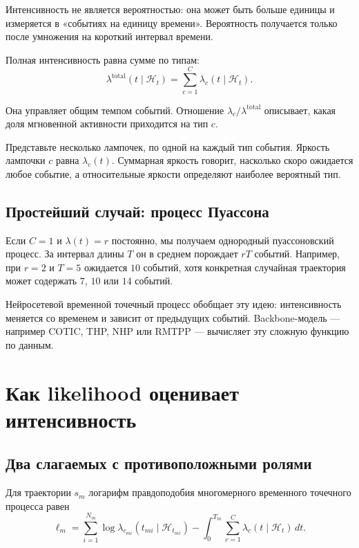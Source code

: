 \documentclass[12pt,a4paper]{article}
\newcommand{\History}{\mathcal{H}}
\newenvironment{intuitionbox}{\par\medskip\noindent{\color{blue}\bfseries Интуиция. }\ignorespaces}{\par\medskip}
\begin{document}
Интенсивность не является вероятностью: она может быть больше единицы и измеряется в «событиях на единицу времени». Вероятность получается только после умножения на короткий интервал времени.

Полная интенсивность равна сумме по типам:
\begin{equation}
\lambda^{\mathrm{total}}(t\mid\History_t)=\sum_{c=1}^{C}\lambda_c(t\mid\History_t).
\end{equation}

Она управляет общим темпом событий. Отношение \(\lambda_c/\lambda^{\mathrm{total}}\) описывает, какая доля мгновенной активности приходится на тип \(c\).

\begin{intuitionbox}
Представьте несколько лампочек, по одной на каждый тип события. Яркость лампочки \(c\) равна \(\lambda_c(t)\). Суммарная яркость говорит, насколько скоро ожидается любое событие, а относительные яркости определяют наиболее вероятный тип.
\end{intuitionbox}

\subsection{Простейший случай: процесс Пуассона}

Если \(C=1\) и \(\lambda(t)=r\) постоянно, мы получаем однородный пуассоновский процесс. За интервал длины \(T\) он в среднем порождает \(rT\) событий. Например, при \(r=2\) и \(T=5\) ожидается \(10\) событий, хотя конкретная случайная траектория может содержать \(7\), \(10\) или \(14\) событий.

Нейросетевой временной точечный процесс обобщает эту идею: интенсивность меняется со временем и зависит от предыдущих событий. Backbone-модель --- например COTIC, THP, NHP или RMTPP --- вычисляет эту сложную функцию по данным.

\section{Как likelihood оценивает интенсивность}

\subsection{Два слагаемых с противоположными ролями}

Для траектории \(s_m\) логарифм правдоподобия многомерного временного точечного процесса равен
\begin{equation}
\ell_m=\sum_{i=1}^{N_m}\log \lambda_{c_{mi}}(t_{mi}\mid\History_{t_{mi}})-\int_0^{T_m}\sum_{c=1}^{C}\lambda_c(t\mid\History_t)\,dt.
\label{eq:tpp-loglik}
\end{equation}
\end{document}
